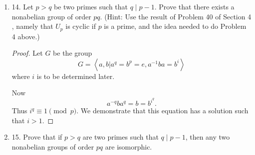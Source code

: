 \begin{enumerate}[resume]
\begin{enumerate}
\begin{proof}
	Now take any $g \in G$. We know that $g^9 = a^k$ and $g^{-1} a g = a^i$ for some $i $ and  $k$. Now
	\[
		a = a^{-k} a a^k = g^{-9}ag^{9} = a^{i^9}
	.\] 
	Thus $i^9 \equiv 1 \pmod {11}$. Surprisingly, the only solution is $i = 1$. Thus $\left\langle a \right\rangle \le  Z(G)$.

	Hence $G / Z(G)$ has order at most $9$. If it has order $3$ or $1$, it is cyclic, and hence $G$ is abelian. If it has order $9$, then  $G / Z(G)$ is abelian. Then it is either isomorphic to $\mathbb{Z}_9$ or isomorphic to $\mathbb{Z}_3 \times  \mathbb{Z}_3$. In the first case we are done. 

	In the second case, 

	There exists $a \in G$ with order $11$. So $\left\langle a \right\rangle \subset G$. Then $\left\langle a \right\rangle \triangleleft G$ by a counting argument.

	Alternative method: use Sylow Third Theorem: There is only one Sylow $11$-subgroup of $G$.

	$|G / \left\langle a \right\rangle | = 9$, Hence $G / \left\langle a \right\rangle $ which is abelian.

	Suppose $b \in G / \left\langle a \right\rangle $. Such an element exists of order $3$.

	Since $\left\langle a \right\rangle  \triangleleft G$ then $b^{-1} ab = a^i$ for some $1\le i\le 10$. Now using conjugacy argument, $i^3 \equiv 1 \pmod 11$. Thus $i = 1$. Hence $ab = ba$. Then $|Z(G)| \ge 33$.
\end{proof}

\item 14. Let $p>q$ be two primes such that $q \mid p-1$. Prove that there exists a nonabelian group of order $p q$. (Hint: Use the result of Problem 40 of Section 4 , namely that $U_p$ is cyclic if $p$ is a prime, and the idea needed to do Problem 4 above.)
\begin{proof}
	Let $G$ be the group
	\[
		G = \left\langle 
		a,b|
		a^q = b^p = e, a^{-1} b a = b^i
		\right\rangle 
	\]
	where $i$ is to be determined later.

	Now
	\[
		a^{-q} b a^q = b = b^{i^q}
	.\] 
	Thus $i^q \equiv 1 \pmod p$. We demonstrate that this equation has a solution such that $i > 1$.


\end{proof}

\item 15. Prove that if $p>q$ are two primes such that $q \mid p-1$, then any two nonabelian groups of order $p q$ are isomorphic.
\end{enumerate}


\end{enumerate}
